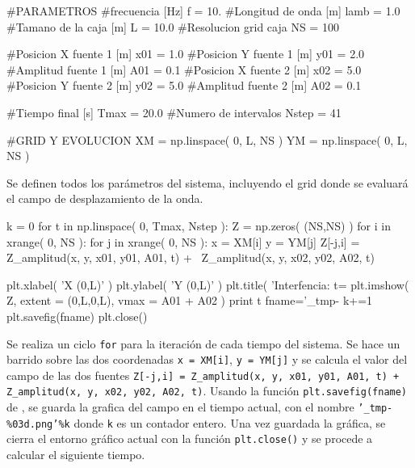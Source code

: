 \begin{listing}[style=python, numbers = none]
#PARAMETROS
#frecuencia		[Hz]
f = 10.
#Longitud de onda	[m]
lamb = 1.0
#Tamano de la caja	[m]
L = 10.0
#Resolucion grid caja
NS = 100

#Posicion X fuente 1	[m]
x01 = 1.0	
#Posicion Y fuente 1	[m]
y01 = 2.0
#Amplitud fuente 1	[m]
A01 = 0.1
#Posicion X fuente 2	[m]
x02 = 5.0	
#Posicion Y fuente 2	[m]
y02 = 5.0
#Amplitud fuente 2	[m]
A02 = 0.1

#Tiempo final		[s]
Tmax = 20.0
#Numero de intervalos
Nstep = 41

#GRID Y EVOLUCION
XM = np.linspace( 0, L, NS )
YM = np.linspace( 0, L, NS )
\end{listing}
Se definen todos los parámetros del sistema, incluyendo el grid donde se 
evaluará el campo de desplazamiento de la onda.


\begin{listing}[style=python, numbers = none]
k = 0
for t in np.linspace( 0, Tmax, Nstep ):
    Z = np.zeros( (NS,NS) )
    for i in xrange( 0, NS ):
	for j in xrange( 0, NS ):
	    x = XM[i]
	    y = YM[j]
	    Z[-j,i] = Z_amplitud(x, y, x01, y01, A01, t) + \
	    Z_amplitud(x, y, x02, y02, A02, t)

    plt.xlabel( 'X (0,L)' )
    plt.ylabel( 'Y (0,L)' )
    plt.title( 'Interfencia: t=%
    plt.imshow( Z, extent = (0,L,0,L), vmax = A01 + A02 )
    print t
    fname='_tmp-%
    k+=1
    plt.savefig(fname)
    plt.close()
\end{listing}
Se realiza un ciclo \texttt{for} para la iteración de cada tiempo del 
sistema. Se hace un barrido sobre las dos coordenadas \texttt{x = XM[i]},
\texttt{y = YM[j]} y se calcula el valor del campo de las dos fuentes 
\texttt{Z[-j,i] = Z\_amplitud(x, y, x01, y01, A01, t) + 
Z\_amplitud(x, y, x02, y02, A02, t)}. Usando la función 
\texttt{plt.savefig(fname)} de \matplotlib, se guarda la grafica del campo
en el tiempo actual, con el nombre \texttt{'\_tmp-\%03d.png'\%k} donde 
\texttt{k} es un contador entero. Una vez guardada la gráfica, se cierra
el entorno gráfico actual con la función \texttt{plt.close()} y se procede
a calcular el siguiente tiempo.



